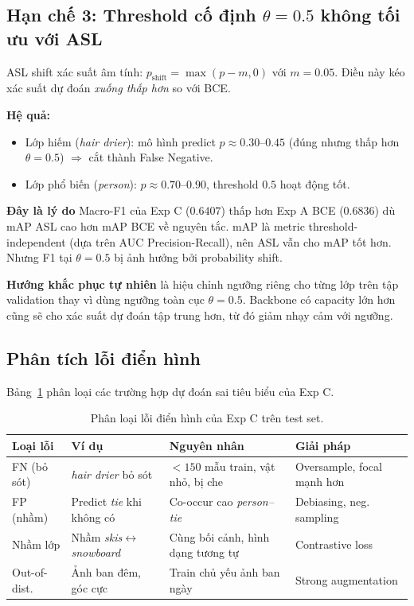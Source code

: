 \documentclass[conference]{IEEEtran}
\begin{document}
\subsection{Hạn chế 3: Threshold cố định $\theta=0.5$ không tối ưu với ASL}

ASL shift xác suất âm tính: $p_{\text{shift}} = \max(p - m, 0)$ với $m=0.05$.
Điều này kéo xác suất dự đoán \textit{xuống thấp hơn} so với BCE.

\textbf{Hệ quả:}
\begin{itemize}[leftmargin=1.8em]
  \item Lớp hiếm (\textit{hair drier}): mô hình predict $p \approx 0.30$--$0.45$
        (đúng nhưng thấp hơn $\theta=0.5$) $\Rightarrow$ cắt thành False Negative.
  \item Lớp phổ biến (\textit{person}): $p \approx 0.70$--$0.90$,
        threshold $0.5$ hoạt động tốt.
\end{itemize}

\textbf{Đây là lý do} Macro-F1 của Exp C ($0.6407$) thấp hơn Exp A BCE ($0.6836$)
dù mAP ASL cao hơn mAP BCE về nguyên tắc.
mAP là metric threshold-independent (dựa trên AUC Precision-Recall),
nên ASL vẫn cho mAP tốt hơn.
Nhưng F1 tại $\theta=0.5$ bị ảnh hưởng bởi probability shift.

\textbf{Hướng khắc phục tự nhiên} là hiệu chỉnh ngưỡng riêng cho từng lớp
trên tập validation thay vì dùng ngưỡng toàn cục $\theta{=}0.5$.
Backbone có capacity lớn hơn cũng sẽ cho xác suất dự đoán tập trung hơn,
từ đó giảm nhạy cảm với ngưỡng.

\subsection{Phân tích lỗi điển hình}

Bảng~\ref{tab:error} phân loại các trường hợp dự đoán sai tiêu biểu của Exp C.

\begin{table}[t]
  \caption{Phân loại lỗi điển hình của Exp C trên test set.}
  \label{tab:error}
  \centering
  \small
  \begin{tabular}{p{1.5cm}p{1.8cm}p{2cm}p{1.8cm}}
    \toprule
    \textbf{Loại lỗi} & \textbf{Ví dụ} & \textbf{Nguyên nhân} & \textbf{Giải pháp} \\
    \midrule
    FN (bỏ sót) &
      \textit{hair drier} bỏ sót &
      $<150$ mẫu train, vật nhỏ, bị che &
      Oversample, focal mạnh hơn \\
    FP (nhầm) &
      Predict \textit{tie} khi không có &
      Co-occur cao \textit{person--tie} &
      Debiasing, neg. sampling \\
    Nhầm lớp &
      Nhầm \textit{skis}$\leftrightarrow$\textit{snowboard} &
      Cùng bối cảnh, hình dạng tương tự &
      Contrastive loss \\
    Out-of-dist. &
      Ảnh ban đêm, góc cực &
      Train chủ yếu ảnh ban ngày &
      Strong augmentation \\
    \bottomrule
  \end{tabular}
\end{table}
\end{document}
